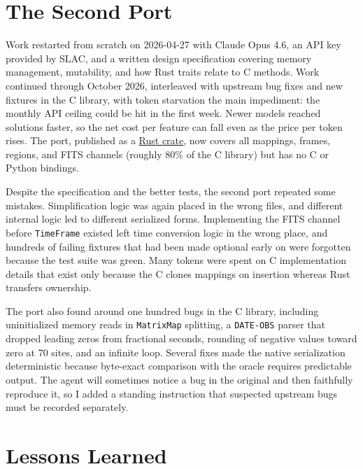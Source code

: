 \section{The Second Port}

Work restarted from scratch on 2026-04-27 with Claude Opus 4.6, an API key provided by SLAC, and a written design specification covering memory management, mutability, and how Rust traits relate to C methods.
Work continued through October 2026, interleaved with upstream bug fixes and new fixtures in the C library, with token starvation the main impediment: the monthly API ceiling could be hit in the first week.
Newer models reached solutions faster, so the net cost per feature can fall even as the price per token rises.
The port, published as a \href{https://crates.io/crates/starlink-ast}{Rust crate}, now covers all mappings, frames, regions, and FITS channels (roughly 80\% of the C library) but has no C or Python bindings.

Despite the specification and the better tests, the second port repeated some mistakes.
Simplification logic was again placed in the wrong files, and different internal logic led to different serialized forms.
Implementing the FITS channel before \texttt{TimeFrame} existed left time conversion logic in the wrong place, and hundreds of failing fixtures that had been made optional early on were forgotten because the test suite was green.
Many tokens were spent on C implementation details that exist only because the C clones mappings on insertion whereas Rust transfers ownership.

The port also found around one hundred bugs in the C library, including uninitialized memory reads in \texttt{MatrixMap} splitting, a \texttt{DATE-OBS} parser that dropped leading zeros from fractional seconds, rounding of negative values toward zero at 70 sites, and an infinite loop.
Several fixes made the native serialization deterministic because byte-exact comparison with the oracle requires predictable output.
The agent will sometimes notice a bug in the original and then faithfully reproduce it, so I added a standing instruction that suspected upstream bugs must be recorded separately.

\section{Lessons Learned}

